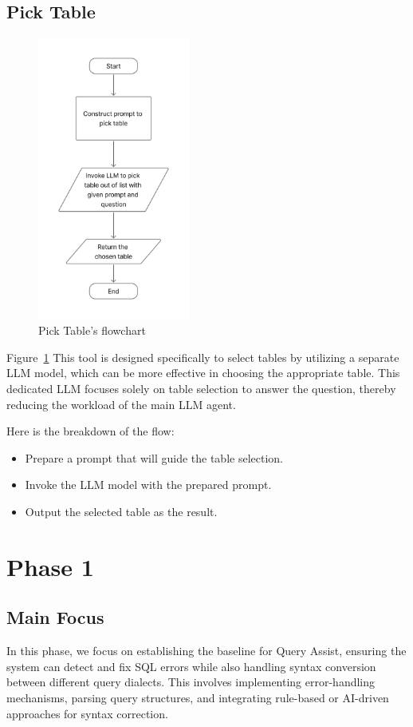     \subsection{Pick Table}
    \begin{figure}[H]
        \centering
        \includegraphics[width=5cm]{chapters/3/figures/pick_table.jpg}
        \caption[Pick Table tool’s flowchart]{Pick Table’s flowchart}
        \label{fig:pick_table}
    \end{figure}
    Figure~\ref{fig:pick_table} This tool is designed specifically to select tables by utilizing a separate LLM model, which can be more effective in choosing the appropriate table. This dedicated LLM focuses solely on table selection to answer the question, thereby reducing the workload of the main LLM agent.

    Here is the breakdown of the flow:
    \begin{itemize}
        \item  Prepare a prompt that will guide the table selection.
        \item  Invoke the LLM model with the prepared prompt.
        \item  Output the selected table as the result.
    \end{itemize}

\section{Phase 1}
    \subsection{Main Focus}
    In this phase, we focus on establishing the baseline for Query Assist, ensuring the system can detect and fix SQL errors while also handling syntax conversion between different query dialects. This involves implementing error-handling mechanisms, parsing query structures, and integrating rule-based or AI-driven approaches for syntax correction.

